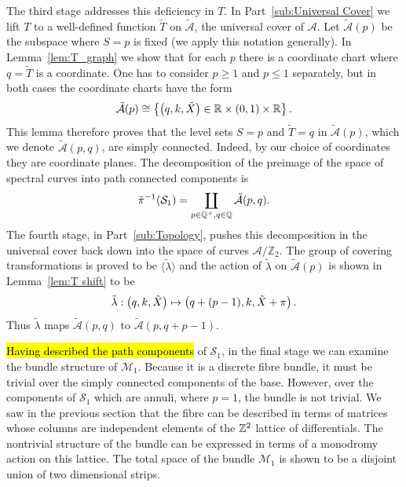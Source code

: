 \documentclass{article}
\begin{document}
The third stage addresses this deficiency in $T$. In Part~\ref{sub:Universal Cover} we lift $T$ to a well-defined function $\tilde{T}$ on $\mathcal{\tilde{A}}$, the universal cover of $\mathcal{A}$. Let $\mathcal{\tilde{A}}(p)$ be the subspace where $S=p$ is fixed (we apply this notation generally). In Lemma~\ref{lem:T_graph} we show that for each $p$ there is a coordinate chart where $q=\tilde{T}$ is a coordinate. One has to consider $p \geq 1$ and $p \leq 1$ separately, but in both cases the coordinate charts have the form 
\[
\mathcal{\tilde{A}}(p) \cong \left\{ \left(q,k,\tilde{X}\right) \in \mathbb{R} \times (0,1) \times \mathbb{R} \right\}.
\]
This lemma therefore proves that the level sets $S = p$ and $\tilde{T} = q$ in $\mathcal{\tilde{A}}(p)$, which we denote $\mathcal{\tilde{A}}(p,q)$, are simply connected. Indeed, by our choice of coordinates they are coordinate planes. The decomposition of the preimage of the space of spectral curves into path connected components is
\[
\tilde{\pi}^{-1}(\mathcal{S}_1) = \coprod_{p \in \mathbb{Q}^+, q\in\mathbb{Q}} \mathcal{\tilde{A}}(p,q).
\]
The fourth stage, in Part~\ref{sub:Topology}, pushes this decomposition in the universal cover back down into the space of curves $\mathcal{A}/\mathbb{Z}_2$.
The group of covering transformations is proved to be $\langle \tilde{\lambda} \rangle$ and the action of $\tilde{\lambda}$ on $\mathcal{\tilde{A}}(p)$ is shown in Lemma~\ref{lem:T shift} to be
\[
\tilde{\lambda} : \left(q,k,\tilde{X}\right) \mapsto \left(q + (p-1),k,\tilde{X} + \pi\right).
\]
Thus $\tilde{\lambda}$ maps $\mathcal{\tilde{A}}(p,q)$ to $\mathcal{\tilde{A}}(p,q + p-1)$. 

\hl{Having described the path components} of $\mathcal{S}_1$, in the final stage we can examine the bundle structure of $\mathcal{M}_1$. Because it is a discrete fibre bundle, it must be trivial over the simply connected components of the base. However, over the components of $\mathcal{S}_1$ which are annuli, where $p=1$, the bundle is not trivial. We saw in the previous section that the fibre can be described in terms of matrices whose columns are independent elements of the $\mathbb{Z}^2$ lattice of differentials. The nontrivial structure of the bundle can be expressed in terms of a monodromy action on this lattice. The total space of the bundle $\mathcal{M}_1$ is shown to be a disjoint union of two dimensional strips.
\end{document}
